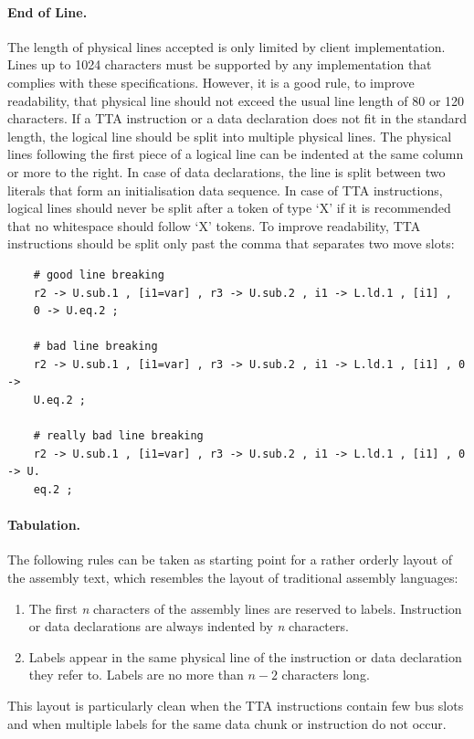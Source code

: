 \documentclass[twoside]{tceusermanual}
\begin{document}
\paragraph{End of Line.}
The length of physical lines accepted is only limited by client
implementation.  Lines up to 1024 characters must be supported by any
implementation that complies with these specifications.
%
However, it is a good rule, to improve readability, that physical line
should not exceed the usual line length of 80 or 120 characters. If a TTA
instruction or a data declaration does not fit in the standard length, the
logical line should be split into multiple physical lines. The physical
lines following the first piece of a logical line can be indented at the
same column or more to the right.
%
In case of data declarations, the line is split between two literals that
form an initialisation data sequence.  In case of TTA instructions, logical
lines should never be split after a token of type `X' if it is recommended
that no whitespace should follow `X' tokens.
%
To improve readability, TTA instructions should be split only past the comma
that separates two move slots:
\begin{verbatim}
    # good line breaking
    r2 -> U.sub.1 , [i1=var] , r3 -> U.sub.2 , i1 -> L.ld.1 , [i1] ,
    0 -> U.eq.2 ;

    # bad line breaking
    r2 -> U.sub.1 , [i1=var] , r3 -> U.sub.2 , i1 -> L.ld.1 , [i1] , 0 ->
    U.eq.2 ;

    # really bad line breaking
    r2 -> U.sub.1 , [i1=var] , r3 -> U.sub.2 , i1 -> L.ld.1 , [i1] , 0 -> U.
    eq.2 ;
\end{verbatim}

\paragraph{Tabulation.}
The following rules can be taken as starting point for a rather orderly
layout of the assembly text, which resembles the layout of traditional
assembly languages:
\begin{enumerate}
\item %
  The first \emph{n} characters of the assembly lines are reserved to
  labels.  Instruction or data declarations are always indented by \emph{n}
  characters.
\item %
  Labels appear in the same physical line of the instruction or data
  declaration they refer to. Labels are no more than $n-2$ characters long.
\end{enumerate}
This layout is particularly clean when the TTA instructions contain few bus
slots and when multiple labels for the same data chunk or instruction do not
occur.
\end{document}
